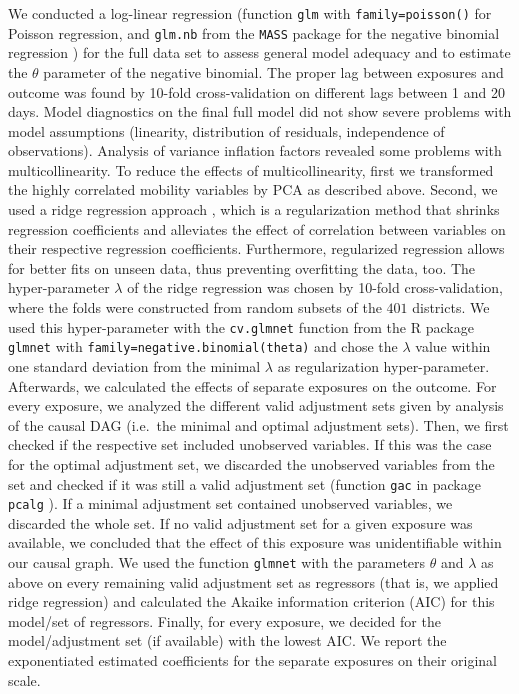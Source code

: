 \documentclass[10pt,letterpaper]{article}
\begin{document}
We conducted a log-linear regression (function \texttt{glm} with \texttt{family=poisson()} for Poisson regression, and \texttt{glm.nb} from the \texttt{MASS} package for the negative binomial regression \cite{mass}) for the full data set to assess general model adequacy and to estimate the \(\theta\) parameter of the negative binomial. The proper lag between exposures and outcome was found by 10-fold cross-validation on different lags between 1 and 20 days. Model diagnostics on the final full model did not show severe problems with model assumptions (linearity, distribution of residuals, independence of observations). Analysis of variance inflation factors revealed some problems with multicollinearity. To reduce the effects of multicollinearity, first we transformed the highly correlated mobility variables by PCA as described above. Second, we used a ridge regression approach \cite{ridge1970}, which is a regularization method that shrinks regression coefficients and alleviates the effect of correlation between variables on their respective regression coefficients. Furthermore, regularized regression allows for better fits on unseen data, thus preventing overfitting the data, too. The hyper-parameter \(\lambda\) of the ridge regression was chosen by 10-fold cross-validation, where the folds were constructed from random subsets of the \(401\) districts. We used this hyper-parameter with the \texttt{cv.glmnet} function from the R package \texttt{glmnet} \cite{glmnet2010} with \texttt{family=negative.binomial(theta)} and chose the \(\lambda\) value within one standard deviation from the minimal \(\lambda\) as regularization hyper-parameter. Afterwards, we calculated the effects of separate exposures on the outcome. For every exposure, we analyzed the different valid adjustment sets given by analysis of the causal DAG (i.e.~the minimal and optimal adjustment sets). Then, we first checked if the respective set included unobserved variables. If this was the case for the optimal adjustment set, we discarded the unobserved variables from the set and checked if it was still a valid adjustment set (function \texttt{gac} in package \texttt{pcalg} \cite{perkovi2015complete}). If a minimal adjustment set contained unobserved variables, we discarded the whole set. If no valid adjustment set for a given exposure was available, we concluded that the effect of this exposure was unidentifiable within our causal graph. We used the function \texttt{glmnet} with the parameters \(\theta\) and \(\lambda\) as above on every remaining valid adjustment set as regressors (that is, we applied ridge regression) and calculated the Akaike information criterion (AIC) for this model/set of regressors. Finally, for every exposure, we decided for the model/adjustment set (if available) with the lowest AIC. We report the exponentiated estimated coefficients for the separate exposures on their original scale.
\end{document}
